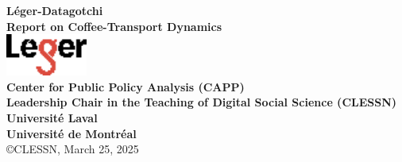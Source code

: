 \documentclass[
  letterpaper,
  DIV=11,
  numbers=noendperiod]{scrartcl}
\author{}
\date{}
\begin{document}
\begin{titlepage}
  \newfontfamily{}


  \begin{center}
    \null{} %
    {\titlepagefont\fontsize{48pt}{18pt}\selectfont \textbf{Léger-Datagotchi}}\\[1cm]
    {\titlepagefont\fontsize{25pt}{18pt}\selectfont \textbf{Report on Coffee-Transport Dynamics}}\\[1cm]
    \includegraphics[width=0.2\textwidth]{img/leger_small.png}\\[4cm]
    {\titlepagefont\fontsize{16pt}{16pt}\selectfont \textbf{Center for Public Policy Analysis (CAPP)}}\\[0.5cm]
    {\titlepagefont\fontsize{16pt}{16pt}\selectfont \textbf{Leadership Chair in the Teaching of Digital Social Science (CLESSN)}}\\[3cm]
    {\titlepagefont\fontsize{16pt}{16pt}\selectfont \textbf{Université Laval}}\\[0.5cm]
    {\titlepagefont\fontsize{16pt}{16pt}\selectfont \textbf{Université de Montréal}}\\[1cm]
    {\titlepagefont\fontsize{12pt}{12pt}\selectfont \copyright \thinspace CLESSN, March 25, 2025}\\
    \null{} %
  \end{center}  \thispagestyle{empty} %
  \clearpage %
\end{titlepage}
\end{document}
